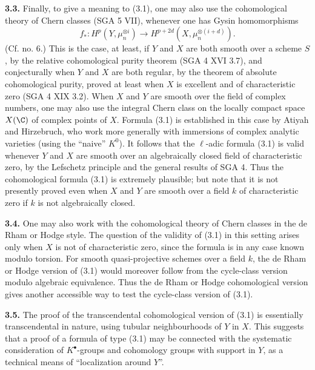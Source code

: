 \textbf{3.3.} Finally, to give a meaning to (3.1), one may also use the cohomological theory of Chern classes (SGA 5 VII), whenever one has Gysin homomorphisms
\[
  f_*:H^p(Y,\mu_n^{\otimes i})
  \longrightarrow H^{p+2d}(X,\mu_n^{\otimes(i+d)}).
\]
(Cf. no. 6.) This is the case, at least, if $Y$ and $X$ are both smooth over a scheme $S$, by the relative cohomological purity theorem
(SGA 4 XVI 3.7), and
conjecturally when $Y$ and $X$ are both regular, by the theorem of absolute
cohomological purity, proved at least when $X$ is excellent and of
characteristic zero (SGA 4 XIX 3.2). When $X$ and $Y$ are smooth over the
field of complex numbers, one may also use the integral Chern class on the
locally compact space $X(\C)$ of complex points of $X$. Formula (3.1) is
established in this case by Atiyah and Hirzebruch, who work more generally
with immersions of complex analytic varieties (using the ``naive''
$K^0$). It follows that the $\ell$-adic formula (3.1) is valid whenever $Y$
and $X$ are smooth over an algebraically closed field of characteristic
zero, by the Lefschetz principle and the general results of SGA 4. Thus the
cohomological formula (3.1) is extremely plausible; but note that it is not
presently proved even when $X$ and $Y$ are smooth over a field $k$ of
characteristic zero if $k$ is not algebraically closed.

\textbf{3.4.} One may also work with the cohomological theory of Chern
classes in the de Rham or Hodge style. The question of the validity of
(3.1) in this setting arises only when $X$ is not of characteristic zero,
since the formula is in any case known modulo torsion. For smooth
quasi-projective schemes over a field $k$, the de Rham or Hodge version of
(3.1) would moreover follow from the cycle-class version modulo algebraic
equivalence. Thus the de Rham or Hodge cohomological version gives another
accessible way to test the cycle-class version of (3.1).

\textbf{3.5.} The proof of the transcendental cohomological version of
(3.1) is essentially transcendental in nature, using tubular neighbourhoods
of $Y$ in $X$. This suggests that a proof of a formula of type (3.1) may be
connected with the systematic consideration of $K^\bullet$-groups and
cohomology groups with support in $Y$, as a technical means of
``localization around $Y$''.

